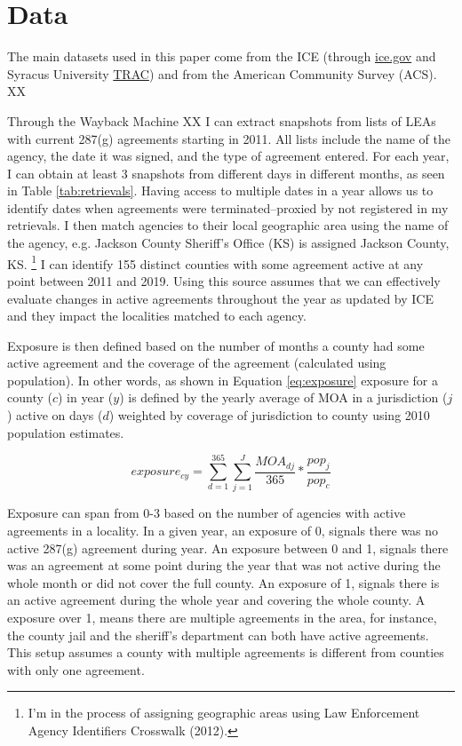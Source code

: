 \documentclass{article}
\begin{document}
\section{Data}
The main datasets used in this paper come from the ICE (through \hyperlink{https://www.ice.gov}{ice.gov} and Syracus University \hyperlink{https://tracreports.org/immigration/tools/}{TRAC}) and from the American Community Survey (ACS). XX

Through the Wayback Machine XX I can extract snapshots from lists of LEAs with current 287(g) agreements starting in 2011. All lists include the name of the agency, the date it was signed, and the type of agreement entered. For each year, I can obtain at least 3 snapshots from different days in different months, as seen in Table \ref{tab:retrievals}. Having access to multiple dates in a year allows us to identify dates when agreements were terminated--proxied by not registered in my retrievals. I then match agencies to their local geographic area using the name of the agency, e.g. Jackson County Sheriff’s Office (KS) is assigned Jackson County, KS. \footnote{I'm in the process of assigning geographic areas using Law Enforcement Agency Identifiers Crosswalk (2012).} I can identify 155 distinct counties with some agreement active at any point between 2011 and 2019. Using this source assumes that we can effectively evaluate changes in active agreements throughout the year as updated by ICE and they impact the localities matched to each agency.

Exposure is then defined based on the number of months a county had some active agreement and the coverage of the agreement (calculated using population). In other words, as shown in Equation \ref{eq:exposure} exposure for a county ($c$) in year ($y$) is defined by the yearly average of MOA in a jurisdiction ($j$) active on days ($d$) weighted by coverage of jurisdiction to county using 2010 population estimates.

\begin{equation}
\label{eq:exposure}
    exposure_{cy} = \sum_{d=1}^{365} \sum_{j=1} ^{J} \frac{MOA_{dj}}{365} * \frac{pop_{j}}{pop_{c}}
\end{equation}

Exposure can span from 0-3 based on the number of agencies with active agreements in a locality. In a given year, an exposure of 0, signals there was no active 287(g) agreement during year. An exposure between 0 and 1, signals there was an agreement at some point during the year that was not active during the whole month or did not cover the full county. An exposure of 1, signals there is an active agreement during the whole year and covering the whole county. A exposure over 1, means there are multiple agreements in the area, for instance, the county jail and the sheriff's department can both have active agreements. This setup assumes a county with multiple agreements is different from counties with only one agreement.
\end{document}

